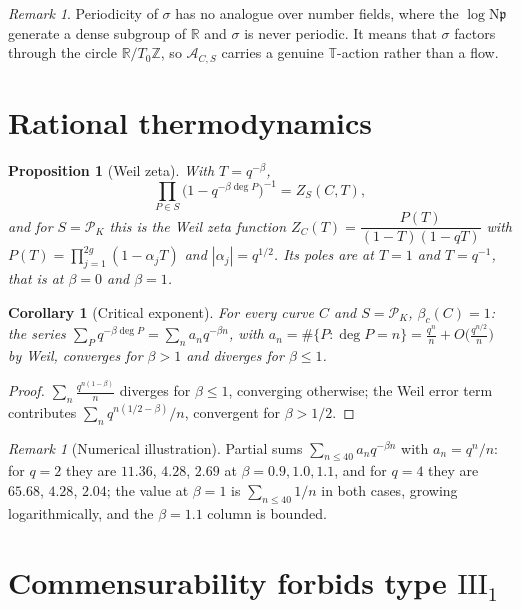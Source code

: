 \documentclass[11pt]{amsart}
\numberwithin{equation}{section}
\newtheorem{proposition}[theorem]{Proposition}
\newtheorem{corollary}[theorem]{Corollary}
\theoremstyle{definition}
\theoremstyle{remark}
\newtheorem{remark}[theorem]{Remark}
\newcommand{\Z}{\mathbb{Z}}
\newcommand{\R}{\mathbb{R}}
\newcommand{\cA}{\mathcal{A}}
\newcommand{\cP}{\mathcal{P}}
\newcommand{\pp}{\mathfrak{p}}
\newcommand{\Ns}{\mathrm{N}}
\begin{document}
\begin{remark}\label{rem:periodic}
Periodicity of $\sigma$ has no analogue over number fields, where the $\log\Ns\pp$ generate a
dense subgroup of $\R$ and $\sigma$ is never periodic. It means that $\sigma$ factors through
the circle $\R/T_0\Z$, so $\cA_{C,S}$ carries a genuine $\mathbb T$-action rather than a flow.
\end{remark}

\section{Rational thermodynamics}

\begin{proposition}[Weil zeta]\label{prop:zeta}
With $T=q^{-\beta}$,
\[
\prod_{P\in S}\bigl(1-q^{-\beta\deg P}\bigr)^{-1}=Z_S(C,T),
\]
and for $S=\cP_K$ this is the Weil zeta function \cite{Weil}
$Z_C(T)=\dfrac{P(T)}{(1-T)(1-qT)}$ with $P(T)=\prod_{j=1}^{2g}(1-\alpha_jT)$ and
$|\alpha_j|=q^{1/2}$. Its poles are at $T=1$ and $T=q^{-1}$, that is at $\beta=0$ and
$\beta=1$.
\end{proposition}

\begin{corollary}[Critical exponent]\label{cor:betac}
For every curve $C$ and $S=\cP_K$, $\beta_c(C)=1$: the series
$\sum_{P}q^{-\beta\deg P}=\sum_n a_nq^{-\beta n}$, with
$a_n=\#\{P:\deg P=n\}=\frac{q^n}{n}+O\bigl(\frac{q^{n/2}}{n}\bigr)$ by Weil, converges for
$\beta>1$ and diverges for $\beta\le1$.
\end{corollary}

\begin{proof}
$\sum_n\frac{q^{n(1-\beta)}}{n}$ diverges for $\beta\le1$, converging otherwise; the Weil
error term contributes $\sum_nq^{n(1/2-\beta)}/n$, convergent for $\beta>1/2$.
\end{proof}

\begin{remark}[Numerical illustration]\label{rem:numbetac}
Partial sums $\sum_{n\le40}a_nq^{-\beta n}$ with $a_n=q^n/n$: for $q=2$ they are $11.36$,
$4.28$, $2.69$ at $\beta=0.9,1.0,1.1$, and for $q=4$ they are $65.68$, $4.28$, $2.04$; the
value at $\beta=1$ is $\sum_{n\le40}1/n$ in both cases, growing logarithmically, and the
$\beta=1.1$ column is bounded.
\end{remark}

\section{Commensurability forbids type $\mathrm{III}_1$}
\end{document}
